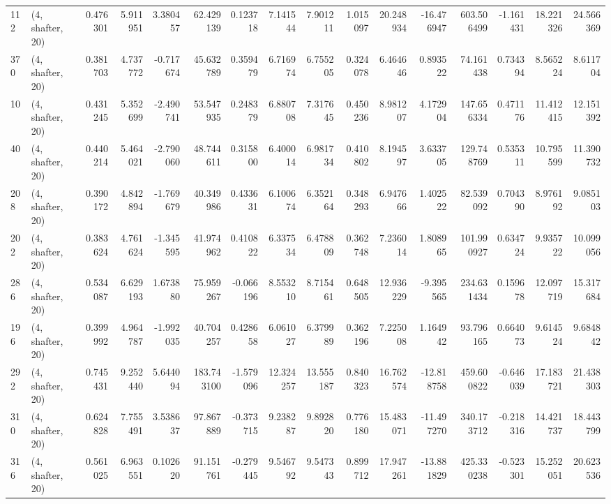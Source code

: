 \begin{tabular}{llrrrrrrrrrrrrrr}
112 &  (4, shafter, 20) &   0.476301 &   5.911951 &   3.380457 &    62.429139 &   0.123718 &   7.141544 &   7.901211 &  1.015097 &  20.248934 & -16.476947 &   603.506499 & -1.161431 &  18.221326 &  24.566369 \\
370 &  (4, shafter, 20) &   0.381703 &   4.737772 &  -0.717674 &    45.632789 &   0.359479 &   6.716974 &   6.755205 &  0.324078 &   6.464646 &   0.893522 &    74.161438 &  0.734394 &   8.565224 &   8.611704 \\
10  &  (4, shafter, 20) &   0.431245 &   5.352699 &  -2.490741 &    53.547935 &   0.248379 &   6.880708 &   7.317645 &  0.450236 &   8.981207 &   4.172904 &   147.656334 &  0.471176 &  11.412415 &  12.151392 \\
40  &  (4, shafter, 20) &   0.440214 &   5.464021 &  -2.790060 &    48.744611 &   0.315800 &   6.400014 &   6.981734 &  0.410802 &   8.194597 &   3.633705 &   129.748769 &  0.535311 &  10.795599 &  11.390732 \\
208 &  (4, shafter, 20) &   0.390172 &   4.842894 &  -1.769679 &    40.349986 &   0.433631 &   6.100674 &   6.352164 &  0.348293 &   6.947666 &   1.402522 &    82.539092 &  0.704390 &   8.976192 &   9.085103 \\
202 &  (4, shafter, 20) &   0.383624 &   4.761624 &  -1.345595 &    41.974962 &   0.410822 &   6.337534 &   6.478809 &  0.362748 &   7.236014 &   1.808965 &   101.990927 &  0.634724 &   9.935722 &  10.099056 \\
286 &  (4, shafter, 20) &   0.534087 &   6.629193 &   1.673880 &    75.959267 &  -0.066196 &   8.553210 &   8.715461 &  0.648505 &  12.936229 &  -9.395565 &   234.631434 &  0.159678 &  12.097719 &  15.317684 \\
196 &  (4, shafter, 20) &   0.399992 &   4.964787 &  -1.992035 &    40.704257 &   0.428658 &   6.061027 &   6.379989 &  0.362196 &   7.225008 &   1.164942 &    93.796165 &  0.664073 &   9.614524 &   9.684842 \\
292 &  (4, shafter, 20) &   0.745431 &   9.252440 &   5.644094 &   183.743100 &  -1.579096 &  12.324257 &  13.555187 &  0.840323 &  16.762574 & -12.818758 &   459.600822 & -0.646039 &  17.183721 &  21.438303 \\
310 &  (4, shafter, 20) &   0.624828 &   7.755491 &   3.538637 &    97.867889 &  -0.373715 &   9.238287 &   9.892820 &  0.776180 &  15.483071 & -11.497270 &   340.173712 & -0.218316 &  14.421737 &  18.443799 \\
316 &  (4, shafter, 20) &   0.561025 &   6.963551 &   0.102620 &    91.151761 &  -0.279445 &   9.546792 &   9.547343 &  0.899712 &  17.947261 & -13.881829 &   425.330238 & -0.523301 &  15.252051 &  20.623536 \\

\end{tabular}
